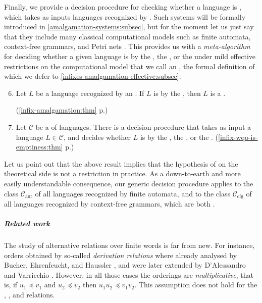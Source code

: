 \AP Finally, we provide a decision procedure for checking whether a language is
, which takes as inputs languages recognized by
 \cite{ASZZ24}. Such systems will be formally
introduced in
\cref{amalgamation-systems:subsec}, but
for the moment let us just say that they include many classical computational
models such as finite automata, context-free grammars, and Petri nets
\cite{ASZZ24}. This provides us with a \emph{meta-algorithm} for deciding
whether a given language is  by the , the , or the  under mild
effective restrictions on the computational model that we call an , the formal definition of which we defer to
\cref{infixes-amalgamation-effective:subsec}.

{
\renewcommand{\labelenumi}{R\arabic{enumi}}
\begin{enumerate}
    \setcounter{enumi}{5}
    \item 
        Let $L$ be a language recognized by an .
        If $L$ is  by the ,
        then $L$ is a .

        \hfill (\cref{infix-amalgamation:thm} p.\pageref{infix-amalgamation:thm})
    \item 
        Let $\mathcal{C}$ be a  of languages.
        There is a decision procedure that takes as input a language $L \in \mathcal{C}$,
        and decides whether $L$ is  by the ,
        the , or the . 
        \hfill (\cref{infix-wqo-is-emptiness:thm} p.\pageref{infix-wqo-is-emptiness:thm})
\end{enumerate}
}
Let us point out that the above result implies that the hypothesis of
 on the theoretical side is not a restriction in
practice. As a down-to-earth and more easily understandable 
consequence,
our generic decision procedure applies 
to the class $\mathcal{C}_\text{aut}$ of all languages recognized by finite automata,
and to the class $\mathcal{C}_\text{cfg}$ of all languages recognized by context-free grammars,
which are both  \cite{aut-cfg-infix:cor}.


\subparagraph{Related work} The study of alternative 
relations over finite words is far from new. For instance, orders obtained by
so-called \emph{derivation relations} where already analysed by Bucher,
Ehrenfeucht, and Haussler \cite{BUEUD85}, and were later extended by
D'Alessandro and Varricchio \cite{ALVA03,ALVA06}. However, in all those cases
the orderings are \emph{multiplicative}, that is, if $u_1 \preceq v_1$ and $u_2
\preceq v_2$ then $u_1u_2 \preceq v_1v_2$. This assumption does not hold for
the , , and  relations.

